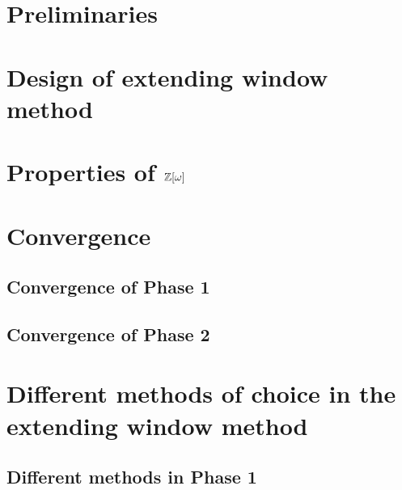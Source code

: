 \documentclass[11pt,a4paper]{report}	%
\theoremstyle{definition}
\begin{document}
\tableofcontents



\chapter{Preliminaries}
	




\chapter{Design of extending window method}
	

\chapter{\texorpdfstring{Properties of $\mathbb{Z}[\omega]$}{Properties of Z[omega]}}
	
	
		
	
\chapter{Convergence}
\label{chap:convergence}

	\section{Convergence of Phase 1}
	

	\section{Convergence of Phase 2}
	
	

	


\chapter{Different methods of choice in the extending window method}
	\label{chap:diffChoices}
	\section{Different methods in Phase 1}
	
\end{document}
